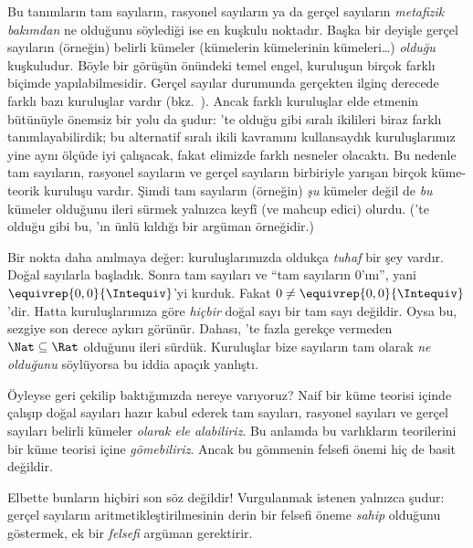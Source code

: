 \documentclass[../../../include/open-logic-section]{subfiles}
\begin{document}
Bu tanımların tam sayıların, rasyonel sayıların ya da gerçel sayıların
\emph{metafizik bakımdan} ne olduğunu söylediği ise en kuşkulu noktadır. Başka
bir deyişle gerçel sayıların (örneğin) belirli kümeler (kümelerin kümelerinin
kümeleri\ldots) \emph{olduğu} kuşkuludur. Böyle bir görüşün önündeki temel
engel, kuruluşun birçok farklı biçimde yapılabilmesidir. Gerçel sayılar
durumunda gerçekten ilginç derecede farklı bazı kuruluşlar vardır
(bkz.\ ). Ancak farklı kuruluşlar elde etmenin bütünüyle
önemsiz bir yolu da şudur: 'te olduğu gibi sıralı
ikilileri biraz farklı tanımlayabilirdik; bu alternatif sıralı ikili kavramını
kullansaydık kuruluşlarımız yine aynı ölçüde iyi çalışacak, fakat elimizde
farklı nesneler olacaktı. Bu nedenle tam sayıların, rasyonel sayıların ve gerçel
sayıların birbiriyle yarışan birçok küme-teorik kuruluşu vardır. Şimdi tam
sayıların (örneğin) \emph{şu} kümeler değil de \emph{bu} kümeler olduğunu
ileri sürmek yalnızca keyfî (ve mahcup edici) olurdu.
('te olduğu gibi bu, \citealt{Benacerraf1965}'ın
ünlü kıldığı bir argüman örneğidir.)

Bir nokta daha anılmaya değer: kuruluşlarımızda oldukça \emph{tuhaf} bir şey
vardır. Doğal sayılarla başladık. Sonra tam sayıları ve “tam sayıların
$0$'ını”, yani $\equivrep{0,0}{\Intequiv}$'yi kurduk. Fakat
$0 \neq \equivrep{0,0}{\Intequiv}$'dir. Hatta kuruluşlarımıza göre
\emph{hiçbir} doğal sayı bir tam sayı değildir. Oysa bu, sezgiye son derece
aykırı görünür. Dahası, 'te fazla gerekçe vermeden
$\Nat \subseteq \Rat$ olduğunu ileri sürdük. Kuruluşlar bize sayıların tam
olarak \emph{ne olduğunu} söylüyorsa bu iddia apaçık yanlıştı.

Öyleyse geri çekilip baktığımızda nereye varıyoruz? Naif bir küme teorisi
içinde çalışıp doğal sayıları hazır kabul ederek tam sayıları, rasyonel
sayıları ve gerçel sayıları belirli kümeler \emph{olarak ele alabiliriz}. Bu
anlamda bu varlıkların teorilerini bir küme teorisi içine \emph{gömebiliriz}.
Ancak bu gömmenin felsefi önemi hiç de basit değildir.

Elbette bunların hiçbiri son söz değildir!{} Vurgulanmak istenen yalnızca
şudur: gerçel sayıların aritmetikleştirilmesinin derin bir felsefi öneme
\emph{sahip} olduğunu göstermek, ek bir \emph{felsefi} argüman gerektirir.

\end{document}
